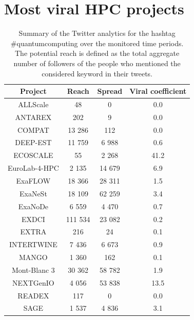
\section{Most viral HPC projects}

\begin{table}[t]
 \begin{center}
 {\scriptsize
  \begin{tabular}{cccc}
   \hline 
   \hline
   Project & Reach & Spread & Viral coefficient \\ 
   \hline
   \hline
   ALLScale & 48 & 0 & 0.0 \\
   ANTAREX & 202 & 9 & 0.0 \\
   COMPAT & 13 286 & 112 & 0.0 \\
   DEEP-EST & 11 759 & 6 988 & 0.6 \\
   ECOSCALE & 55 & 2 268 & 41.2 \\
   EuroLab-4-HPC & 2 135 & 14 679 & 6.9 \\
   ExaFLOW & 18 366 & 28 311 & 1.5 \\
   ExaNeSt & 18 109 & 62 259 & 3.4  \\
   ExaNoDe & 6 559 & 4 470 & 0.7 \\
   EXDCI & 111 534 & 23 082 & 0.2 \\
   EXTRA & 216 & 24 & 0.1 \\
   INTERTWINE & 7 436 & 6 673 & 0.9 \\
   MANGO & 1 360 & 162 & 0.1 \\
   Mont-Blanc 3 & 30 362 & 58 782 & 1.9 \\
   NEXTGenIO & 4 056 & 53 838 & 13.5 \\
   READEX & 117 & 0 & 0.0 \\
   SAGE & 1 537 & 4 836 & 3.1 \\ 
   \hline
   \hline
  \end{tabular}
 } 
 \end{center} 
 \caption{Summary of the Twitter analytics for the hashtag \#quantumcomputing over the monitored time periods. The potential reach is defined as the total aggregate number of followers of the people who mentioned the considered keyword in their tweets.}
\label{HPC_viral_coefficients} 
\end{table}